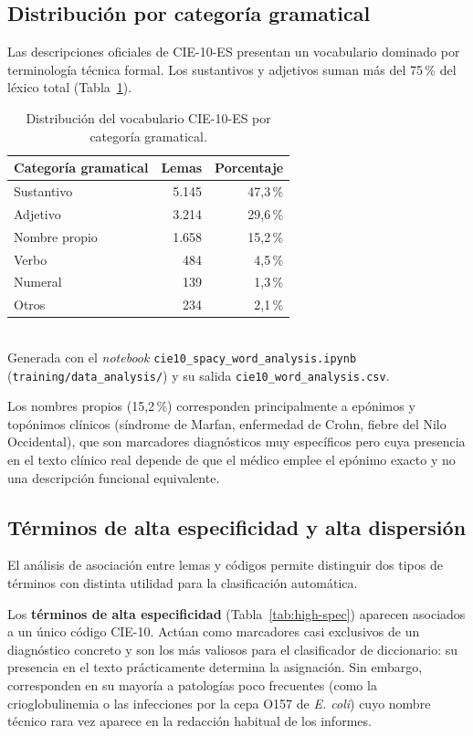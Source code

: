 \subsection{Distribución por categoría gramatical}

Las descripciones oficiales de CIE-10-ES presentan un vocabulario dominado por terminología técnica formal. Los sustantivos y adjetivos suman más del 75\,\% del léxico total (Tabla~\ref{tab:pos-dist}).

\begin{table}[h]
\centering
\caption{Distribución del vocabulario CIE-10-ES por categoría gramatical.}
\label{tab:pos-dist}
\begin{tabular}{lrr}
\hline
\textbf{Categoría gramatical} & \textbf{Lemas} & \textbf{Porcentaje} \\
\hline
Sustantivo & 5.145 & 47{,}3\,\% \\
Adjetivo & 3.214 & 29{,}6\,\% \\
Nombre propio & 1.658 & 15{,}2\,\% \\
Verbo & 484 & 4{,}5\,\% \\
Numeral & 139 & 1{,}3\,\% \\
Otros & 234 & 2{,}1\,\% \\
\hline
\end{tabular}
\\[4pt]
{\footnotesize Generada con el \emph{notebook} \texttt{cie10\_\allowbreak{}spacy\_\allowbreak{}word\_\allowbreak{}analysis.ipynb} (\texttt{training/\allowbreak{}data\_analysis/}) y su salida \texttt{cie10\_\allowbreak{}word\_\allowbreak{}analysis.csv}.}
\end{table}

Los nombres propios (15,2\,\%) corresponden principalmente a epónimos y topónimos clínicos (síndrome de Marfan, enfermedad de Crohn, fiebre del Nilo Occidental), que son marcadores diagnósticos muy específicos pero cuya presencia en el texto clínico real depende de que el médico emplee el epónimo exacto y no una descripción funcional equivalente.

\subsection{Términos de alta especificidad y alta dispersión}

El análisis de asociación entre lemas y códigos permite distinguir dos tipos de términos con distinta utilidad para la clasificación automática.

Los \textbf{términos de alta especificidad} (Tabla~\ref{tab:high-spec}) aparecen asociados a un único código CIE-10. Actúan como marcadores casi exclusivos de un diagnóstico concreto y son los más valiosos para el clasificador de diccionario: su presencia en el texto prácticamente determina la asignación. Sin embargo, corresponden en su mayoría a patologías poco frecuentes (como la crioglobulinemia o las infecciones por la cepa O157 de \emph{E. coli}) cuyo nombre técnico rara vez aparece en la redacción habitual de los informes.

